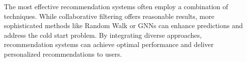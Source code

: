 \documentclass[12pt]{article}
\numberwithin{equation}{section}
\begin{document}
The most effective recommendation systems often employ a combination of techniques. While collaborative filtering offers reasonable results, more sophisticated methods like Random Walk or GNNs can enhance predictions and address the cold start problem. By integrating diverse approaches, recommendation systems can achieve optimal performance and deliver personalized recommendations to users.


\vspace{1em} 




\newpage



\printbibliography
\end{document}

